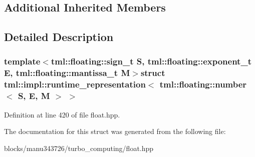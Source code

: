 \subsection*{Additional Inherited Members}


\subsection{Detailed Description}
\subsubsection*{template$<$tml\+::floating\+::sign\+\_\+t S, tml\+::floating\+::exponent\+\_\+t E, tml\+::floating\+::mantissa\+\_\+t M$>$struct tml\+::impl\+::runtime\+\_\+representation$<$ tml\+::floating\+::number$<$ S, E, M $>$ $>$}



Definition at line 420 of file float.\+hpp.



The documentation for this struct was generated from the following file\+:\begin{DoxyCompactItemize}
\item 
blocks/manu343726/turbo\+\_\+computing/float.\+hpp\end{DoxyCompactItemize}
